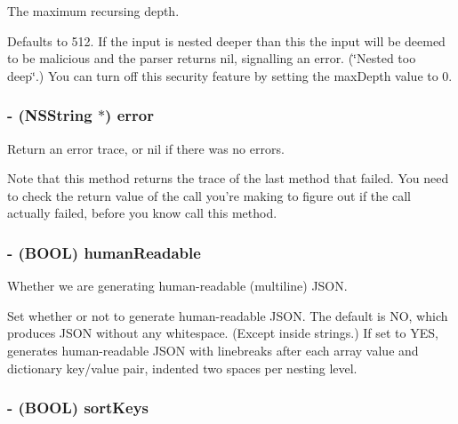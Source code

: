 The maximum recursing depth. 

Defaults to 512. If the input is nested deeper than this the input will be deemed to be malicious and the parser returns nil, signalling an error. (\char`\"{}Nested too deep\char`\"{}.) You can turn off this security feature by setting the maxDepth value to 0. \hypertarget{interface_s_b_json_writer_a9915988454e0ea4111cb05831133b625}{
\subsubsection[{error}]{\setlength{\rightskip}{0pt plus 5cm}-\/ (NSString $\ast$) error}}
\label{interface_s_b_json_writer_a9915988454e0ea4111cb05831133b625}


Return an error trace, or nil if there was no errors. 

Note that this method returns the trace of the last method that failed. You need to check the return value of the call you're making to figure out if the call actually failed, before you know call this method. \hypertarget{interface_s_b_json_writer_a16ca84860a2ee76a03b567dc5181a851}{
\subsubsection[{humanReadable}]{\setlength{\rightskip}{0pt plus 5cm}-\/ (BOOL) humanReadable}}
\label{interface_s_b_json_writer_a16ca84860a2ee76a03b567dc5181a851}


Whether we are generating human-\/readable (multiline) JSON. 

Set whether or not to generate human-\/readable JSON. The default is NO, which produces JSON without any whitespace. (Except inside strings.) If set to YES, generates human-\/readable JSON with linebreaks after each array value and dictionary key/value pair, indented two spaces per nesting level. \hypertarget{interface_s_b_json_writer_af25807a58a322b56cb5d3593532228e5}{
\subsubsection[{sortKeys}]{\setlength{\rightskip}{0pt plus 5cm}-\/ (BOOL) sortKeys}}
\label{interface_s_b_json_writer_af25807a58a322b56cb5d3593532228e5}


